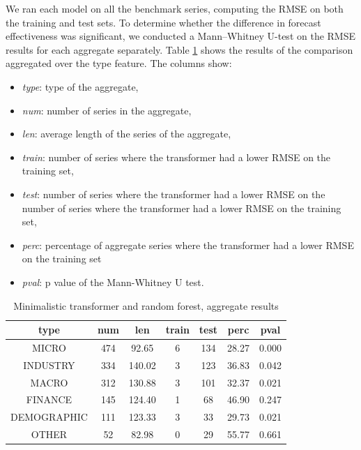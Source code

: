 \documentclass[algorithms,article,submit,pdftex,moreauthors]{Definitions/mdpi}
\begin{document}
We ran each model on all the benchmark series, computing the RMSE on both the training and test sets. To determine whether the difference in forecast effectiveness was significant, we conducted a Mann–Whitney U-test on the RMSE results for each aggregate separately. Table \ref{tab:aggregate} shows the results of the comparison aggregated over the type feature. The columns show:
\begin{itemize}
	\item {\it type}: type of the aggregate,
	\item {\it num}: number of series in the aggregate,
	\item {\it len}: average length of the series of the aggregate,
	\item {\it train}: number of series where the transformer had a lower RMSE on the training set,
	\item {\it test}: number of series where the transformer had a lower RMSE on the number of series where the transformer had a lower RMSE on the training set,
	\item {\it perc}: percentage of aggregate series where the transformer had a lower RMSE on the training set
	\item {\it pval}: p value of the Mann-Whitney U test.
\end{itemize}

\begin{table}[H]
\caption{Minimalistic transformer and random forest, aggregate results}
\label{tab:aggregate}
\centering
\begin{tabular}{ccccccc}
\toprule
{\bf type} & {\bf num} & len & {\bf train} & {\bf test} & {\bf perc} & {\bf pval}\\
\midrule
MICRO 		& 474 &  92.65 & 6 & 134 & 28.27 & 0.000\\
INDUSTRY 	& 334 & 140.02 & 3 & 123 & 36.83 & 0.042\\
MACRO 		& 312 & 130.88 & 3 & 101 & 32.37 & 0.021\\
FINANCE 	& 145 & 124.40 & 1 &  68 & 46.90 & 0.247\\
DEMOGRAPHIC & 111 & 123.33 & 3 &  33 & 29.73 & 0.021\\
OTHER 		&  52 &  82.98 & 0 &  29 & 55.77 & 0.661\\
\bottomrule
\end{tabular}
\end{table}
\end{document}
